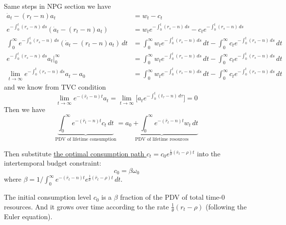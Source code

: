 \begin{remark*}[How to get the ${\int_{0}^{\infty } e^{-(\bar{r}_t-n)t}c_t \, dt} = {a_0 + \int_{0}^{\infty } e^{-(\bar{r}_t-n)t}w_t \, dt}$?]
    Same steps in NPG section we have \begin{align*}
        \dot{a}_t - (r_t -n) a_t                                                               & = w_t - c_t                                                                                                                            \\
        e^{-\int_{0}^{t} (r_s - n) \, ds} (\dot{a}_t - (r_t -n) a_t)                           & = w_t  e^{-\int_{0}^{t} (r_s - n) \, ds} - c_t e^{-\int_{0}^{t} (r_s - n) \, ds}                                                       \\
        \int_{0}^{\infty } e^{-\int_{0}^{t} (r_s - n) \, ds} (\dot{a}_t - (r_t -n) a_t)  \, dt & = \int_{0}^{\infty }  w_t  e^{-\int_{0}^{t} (r_s - n) \, ds}  \, dt - \int_{0}^{\infty } c_t e^{-\int_{0}^{t} (r_s - n) \, ds}  \, dt  \\
        e^{-\int_{0}^{t} (r_s - n) \, ds}a_t \Big|_0^\infty                                    & =  \int_{0}^{\infty }  w_t  e^{-\int_{0}^{t} (r_s - n) \, ds}  \, dt - \int_{0}^{\infty } c_t e^{-\int_{0}^{t} (r_s - n) \, ds}  \, dt \\
        \lim_{t \to \infty} e^{-\int_{0}^{t} (r_s - n) \, ds}a_t -  a_0                        & = \int_{0}^{\infty }  w_t  e^{-\int_{0}^{t} (r_s - n) \, ds}  \, dt - \int_{0}^{\infty } c_t e^{-\int_{0}^{t} (r_s - n) \, ds}  \, dt
    \end{align*}
    and we know from TVC condition \[
        \lim_{t \to \infty} e^{-(\bar{r}_t - n)t}a_t = \lim_{t \to \infty} \Big[a_t e^{-\int_{0}^{t} (t_{\tau}-n) \, d\tau}\Big] = 0
    \]
    Then we have \[
        \underbrace{\int_{0}^{\infty } e^{-(\bar{r}_t-n)t}c_t \, dt}_{\text{PDV of lifetime consumption}} = \underbrace{a_0 + \int_{0}^{\infty } e^{-(\bar{r}_t-n)t}w_t \, dt}_{\text{PDV of lifetime resources}}
    \]
\end{remark*}

Then substitute \underline{the optimal consumption path $c_t = c_0 e^{\frac{1}{\theta}(\bar{r}_t - \rho)t}$} into the intertemporal budget constraint: \[
    c_0 = \beta \omega_0
\] where $\beta = 1/\int_{0}^{\infty } e^{-(\bar{r}_t-n)t} e^{\frac{1}{\theta}(\bar{r}_t - \rho)t}\, dt$.

The initial consumption level $c_0$ is a $\beta$ fraction of the PDV of total time-$0$ resources. And it grows over time according to the rate $\frac{1}{\theta}(r_t-\rho)$ (following the Euler equation).

